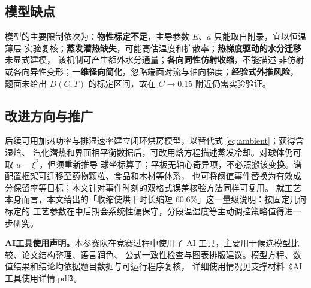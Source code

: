 \documentclass[bwprint]{cumcmthesis}
\begin{document}
\subsection{模型缺点}

模型的主要限制依次为：\textbf{物性标定不足}，主导参数 $E$、$a$ 只能取自附录，宜以恒温薄层
实验复核；\textbf{蒸发潜热缺失}，可能高估温度和扩散率；\textbf{热梯度驱动的水分迁移}未显式建模，
该机制可产生额外水分通量\cite{philip}；\textbf{各向同性仿射收缩}，不能描述
非仿射或各向异性变形；\textbf{一维径向简化}，忽略端面对流与轴向梯度；\textbf{经验式外推风险}，
题面未给出 $D(C,T)$ 的标定区间，故在 $C\to0.15$ 附近仍需实验验证。

\subsection{改进方向与推广}

后续可用加热功率与排湿速率建立闭环烘房模型，以替代式 \eqref{eq:ambient}；获得含湿焓、
汽化潜热和界面相平衡数据后，可改用焓方程描述蒸发冷却。对球体仍可取 $u=\xi^2$，但须重新推导
球坐标算子；平板无轴心奇异项，不必照搬该变换。谱配置框架可迁移至药物颗粒、食品和木材等体系，
也可将阈值事件替换为有效成分保留率等目标；本文针对事件时刻的双格式误差核验方法同样可复用。
就工艺本身而言，本文给出的「收缩使烘干时长缩短 $60.6\%$」这一量级说明：按固定几何标定的
工艺参数在中后期会系统性偏保守，分段温湿度等主动调控策略\cite{ju2019stepdown}值得进一步研究。

\noindent\textbf{AI工具使用声明。}本参赛队在竞赛过程中使用了 AI 工具，主要用于候选模型比较、论文结构整理、语言润色、
公式一致性检查与图表排版建议。模型方程、数值结果和结论均依据题目数据与可运行程序复核，
详细使用情况见支撑材料《AI工具使用详情.pdf》。
\end{document}
